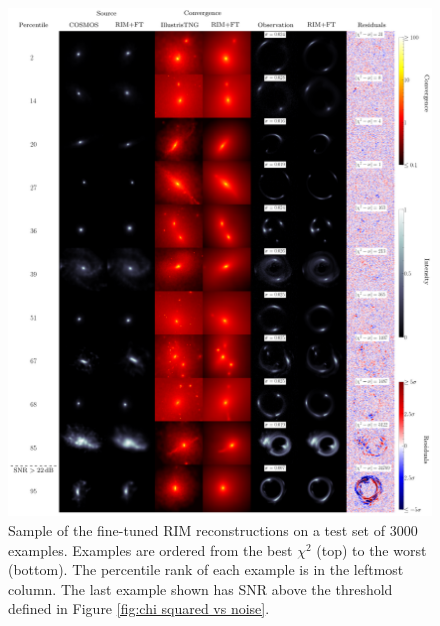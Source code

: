 \begin{figure}[H]
        \centering
        \includegraphics[width=\linewidth]{figures/main_result}
        \caption{
                Sample of the fine-tuned RIM reconstructions 
                on a test set of 3000 examples. 
                Examples are ordered from the best $\chi^2$ (top) to the worst (bottom). 
                The percentile rank of each example is in the leftmost column. 
                The last example 
        shown has SNR above the threshold defined in Figure \ref{fig:chi squared vs noise}.}
        \label{fig:main result}
\end{figure}

